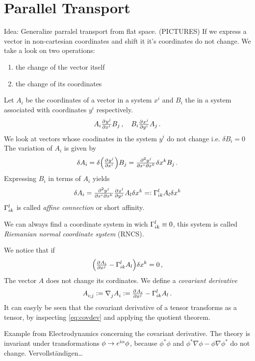 \section{Parallel Transport}
Idea: Generalize parralel transport from flat space.
(PICTURES) 
If we express a vector in non-cartesian coordinates and shift it it's
coordinates do not change.
We take a look on two operations:
\begin{enumerate}
\item the change of the vector itself
\item the change of its coordinates
\end{enumerate}
Let $A_i$ be the coordinates of a vector in a system $x^i$ and $B_i$ the in a
system associated with coordinates $y^i$ respectively.
\begin{equation}
A_i\pd{{y^j}}{{x^i}}B_j\, ,\quad B_i\pd{{x^j}}{{y^i}}A_j\, .
\end{equation}
We look at vectors whose coodinates in the system $y^i$ do not change i.e.
$\delta B_i=0$ The variation of $A_i$ is given by
\begin{equation}
\delta
A_i=\delta\left(\pd{{y^j}}{{x^i}}\right)B_j
=\md{{y^j}}{2}{{x^i}}{}{{x^k}}{}\delta
x^k B_j\, .
\end{equation}
Expressing $B_i$ in terms of $A_i$ yields
\begin{equation}
\delta A_i = \md{{y^j}}{2}{{x^i}}{}{{x^k}}{}\pd{{x^l}}{{y^j}}A_l\delta x^k
=:\affin{l}{i}{k}A_l\delta x^k
\end{equation}
$\Gamma^{l}_{i k}$ is called \emph{affine connection} or short affinity.
\begin{remark}
We can always find a coordinate system in wich $\Gamma^{l}_{i k}\equiv 0$, this
system is called \emph{Riemanian normal coordinate system} (RNCS).
\end{remark}
We notice that if 
\begin{equation}
\left(\pd{{A_i}}{{x^j}}-\affin{l}{i}{k}A_l\right)\delta x^k = 0\,
,\label{eq:covdev}
\end{equation}
The vector $A$ does not change its cordinates. We define a \emph{covariant
derivative} 
\begin{equation}
\tensor{A}{_i_;_j}:=\tensor{\nabla}{_j}\tensor{A}{_i}:=\pd{{A_i}}{{x^j}}-\affin{l}{i}{k}A_l\,
.
\end{equation}
It can easyly be seen that the covariant derivative of a tensor transforms as a
tensor, by inspecting \eqref{eq:covdev} and applying the quotient theorem.
\begin{remark} Example from Electrodynamics concerning the covariant derivative. 
The theory is invariant under transformations $\phi\to e^{\mathrm{i} \alpha}\phi$, 
because $\phi^*\phi$ and $\phi^*\nabla\phi-\phi\nabla\phi^*$ do not change.
Vervollständigen\ldots
\end{remark}
